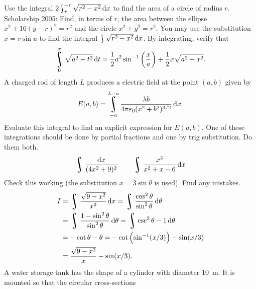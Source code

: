 \begin{questions}
  \questioS Use the integral $ 2\rint^{-r}_r \sqrt{r^2 - x^2} \dif{x} $ to find the area of a circle of radius $ r $.
  \questioS Scholarship 2005: Find, in terms of $ r $, the area between the ellipse $ x^2 + 16(y-r)^2 = r^2 $ and
            the circle $ x^2 + y^2 = r^2 $. You may use the substitution $ x = r \sin u $ to find the integral $ \rint \sqrt{r^2 - x^2} \dif{x} $.
  \questioS By integrating, verify that
            \begin{displaymath}
              \rint^x_0 \sqrt{a^2 - t^2} \dif{t} = \frac{1}{2} a^2 \sin^{-1} \left(\frac{x}{a}\right) + \frac{1}{2} x \sqrt{a^2 - x^2}.
            \end{displaymath}
  \questioS A charged rod of length $ L $ produces a electric field at the point $ (a,b) $ given by
            \begin{displaymath}
              E(a,b) = \rint^{L - a}_{-a} \frac{\lambda b}{4\pi \varepsilon_0 (x^2 + b^2)^{3/2}} \dif{x}.
            \end{displaymath}
            Evaluate this integral to find an explicit expression for $ E(a,b) $.
  \questioO One of these integrations should be done by partial fractions and one by trig substitution. Do them both.
            \begin{displaymath}
              \rint \frac{\dif{x}}{(4x^2 + 9)^2} \quad\quad \rint \frac{x^3}{x^2 + x - 6} \dif{x}
            \end{displaymath}
  \questioS Check this working (the substitution $ x = 3\sin\theta $ is used). Find any mistakes.
            \begin{align*}
              I &= \rint \frac{\sqrt{9 - x^2}}{x^2} \dif{x} = \rint \frac{\cos^2 \theta}{\sin^2 \theta} \dif{\theta}\\
                &= \rint \frac{1 - \sin^2 \theta}{\sin^2 \theta} \dif{\theta} = \rint \csc^2 \theta -1 \dif{\theta}\\
                &= -\cot \theta - \theta = -\cot\left(\sin^{-1} (x/3)\right) - \sin (x/3)\\
                &= \frac{\sqrt{9-x^2}}{x} - \sin(x/3).
            \end{align*}
  \questioS A water storage tank has the shape of a cylinder with diameter \SI{10}{\metre}. It is mounted so that the circular cross-sections

\end{questions}
